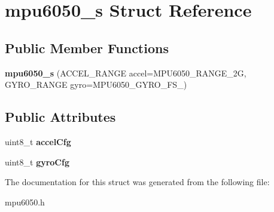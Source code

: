 \hypertarget{structmpu6050__s}{}\section{mpu6050\+\_\+s Struct Reference}
\label{structmpu6050__s}
\subsection*{Public Member Functions}
\begin{DoxyCompactItemize}
\item 
\mbox{\label{structmpu6050__s_ab8ff10bcdf8741b34b5fa0d44d8d444c}} 
{\bfseries mpu6050\+\_\+s} (A\+C\+C\+E\+L\+\_\+\+R\+A\+N\+GE accel=M\+P\+U6050\+\_\+\+R\+A\+N\+G\+E\+\_\+2G, G\+Y\+R\+O\+\_\+\+R\+A\+N\+GE gyro=M\+P\+U6050\+\_\+\+G\+Y\+R\+O\+\_\+\+F\+S\+\_)
\end{DoxyCompactItemize}
\subsection*{Public Attributes}
\begin{DoxyCompactItemize}
\item 
\mbox{\label{structmpu6050__s_ad31e74a1edf8e3a6259925c87fc8043e}} 
uint8\+\_\+t {\bfseries accel\+Cfg}
\item 
\mbox{\label{structmpu6050__s_a2e8ba692a704c815ce6e4c6288b64787}} 
uint8\+\_\+t {\bfseries gyro\+Cfg}
\end{DoxyCompactItemize}


The documentation for this struct was generated from the following file\+:\begin{DoxyCompactItemize}
\item 
mpu6050.\+h\end{DoxyCompactItemize}
